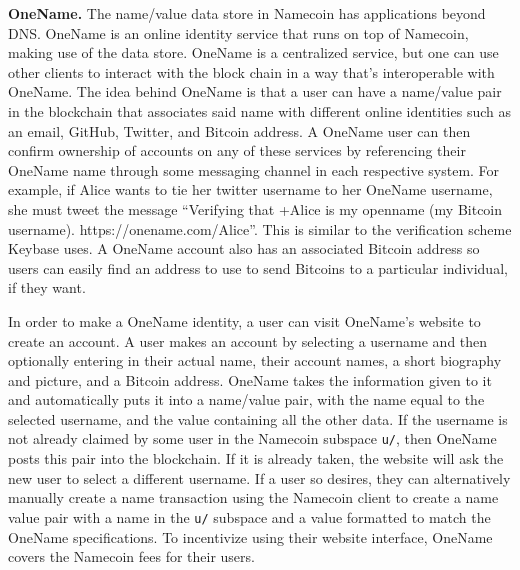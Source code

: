 {\bf OneName.}
The name/value data store in Namecoin has applications beyond DNS. OneName is an online identity service that runs on top of Namecoin, making use of the data store. OneName is a centralized service, but one can use other clients to interact with the block chain in a way that's interoperable with OneName. The idea behind OneName is that a user can have a name/value pair in the blockchain that associates said name with different online identities such as an email, GitHub, Twitter, and Bitcoin address. A OneName user can then confirm ownership of accounts on any of these services by referencing their OneName name through some messaging channel in each respective system. For example, if Alice wants to tie her twitter username to her OneName username, she must tweet the message ``Verifying that +Alice is my openname (my Bitcoin username). https://onename.com/Alice''. This is similar to the verification scheme Keybase uses. A OneName account also has an associated Bitcoin address so users can easily find an address to use to send Bitcoins to a particular individual, if they want.

In order to make a OneName identity, a user can visit OneName's website to create an account. A user makes an account by selecting a username and then optionally entering in their actual name, their account names, a short biography and picture, and a Bitcoin address. OneName takes the information given to it and automatically puts it into a name/value pair, with the name equal to the selected username, and the value containing all the other data. If the username is not already claimed by some user in the Namecoin subspace {\tt u/}, then OneName posts this pair into the blockchain. If it is already taken, the website will ask the new user to select a different username. If a user so desires, they can alternatively manually create a name transaction using the Namecoin client to create a name value pair with a name in the {\tt u/} subspace and a value formatted to match the OneName specifications. To incentivize using their website interface, OneName covers the Namecoin fees for their users. 

